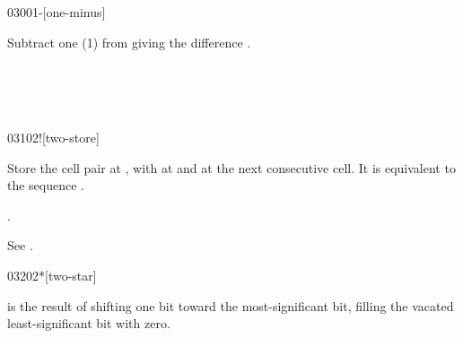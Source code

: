 \begin{worddef}{0300}{1-}[one-minus]
\item {}

	Subtract one (1) from  giving the difference
	.

	\begin{testing} %
		 \\
		 \\
		 \\
	\end{testing}
\end{worddef}


\begin{worddef}{0310}{2!}[two-store]
\item {}

	Store the cell pair  at , with
	 at  and  at the next
	consecutive cell. It is equivalent to the sequence
	  \word{!}  \word{!}.

\see {}.

	\begin{testing} %
		See .
	\end{testing}
\end{worddef}


\begin{worddef}{0320}{2*}[two-star]
\item {}

	 is the result of shifting  one bit toward
	the most-significant bit, filling the vacated least-significant
	bit with zero.

	\begin{testing} %
		 \\
		 \\
		 \\
		 \\
	\end{testing}
\end{worddef}


